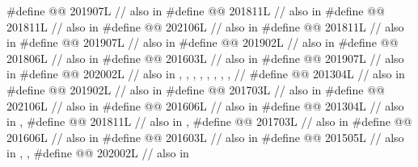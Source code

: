 \begin{codeblock}
#define @@                  201907L // also in 
#define @@             201811L // also in 
#define @@                   201811L // also in 
#define @@                202106L // also in 
#define @@                 201811L // also in 
#define @@                  201907L // also in 
#define @@                         201902L // also in 
#define @@                 201806L // also in 
#define @@           201603L // also in 
#define @@                            201907L // also in 
#define @@                          202002L
  // also in , , , , , , , ,
  // 
#define @@                 201304L // also in 
#define @@                         201902L // also in 
#define @@                        201703L // also in 
#define @@                            202106L // also in 
#define @@                           201606L // also in 
#define @@        201304L // also in , 
#define @@          201811L
  // also in , 
#define @@        201703L // also in 
#define @@ 201606L // also in 
#define @@                             201603L // also in 
#define @@     201505L
  // also in , , 
#define @@                          202002L // also in 

\end{codeblock}
